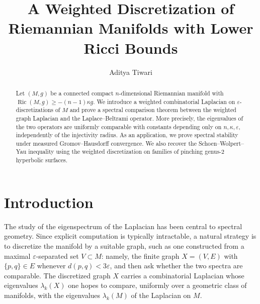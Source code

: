 \documentclass[10pt,reqno]{amsart}
\theoremstyle{remark}
\newcommand{\Ric}{\operatorname{Ric}}
\begin{document}
\title{\textbf{A Weighted Discretization of Riemannian Manifolds with Lower Ricci Bounds}}
\author{Aditya Tiwari}
\address{Department of Mathematical Sciences, Indian Institute of Science Education
and Research Mohali, Sector 81, SAS Nagar, Punjab, 140306, India.}

\begin{abstract}
Let $(M,g)$ be a connected compact $n$-dimensional Riemannian manifold
with $\Ric(M,g)\geq-(n-1)\kappa g$. We introduce a weighted combinatorial Laplacian on $\varepsilon$-discretizations of $M$ and prove a spectral comparison theorem between the weighted graph Laplacian and the Laplace--Beltrami operator. More precisely, the eigenvalues of the two operators are uniformly comparable with constants depending only on $n,\kappa,\varepsilon$,
independently of the injectivity radius. As an application, we prove spectral stability under measured Gromov--Hausdorff convergence. We also recover the Schoen--Wolpert--Yau inequality using the weighted discretization on families of pinching genus-$2$ hyperbolic surfaces.
\end{abstract}

\maketitle

\section{Introduction}
\label{sec:intro}
The study of the eigenspectrum of the Laplacian has been central to
spectral geometry. Since explicit computation is typically intractable,
a natural strategy is to discretize the manifold by a suitable graph,
such as one constructed from a maximal $\varepsilon$-separated set
$V\subset M$: namely, the finite graph $X=(V,E)$ with $\{p,q\}\in E$
whenever $d(p,q)<3\varepsilon$, and then ask whether the two spectra
are comparable. The discretized graph $X$ carries a combinatorial
Laplacian whose eigenvalues $\lambda_k(X)$ one hopes to compare,
uniformly over a geometric class of manifolds, with the eigenvalues
$\lambda_k(M)$ of the Laplacian on $M$. 
\end{document}
